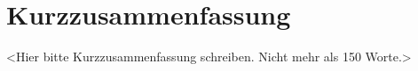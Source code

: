 \chapter*{Kurzzusammenfassung}


<Hier bitte Kurzzusammenfassung schreiben. Nicht mehr als 150 Worte.>